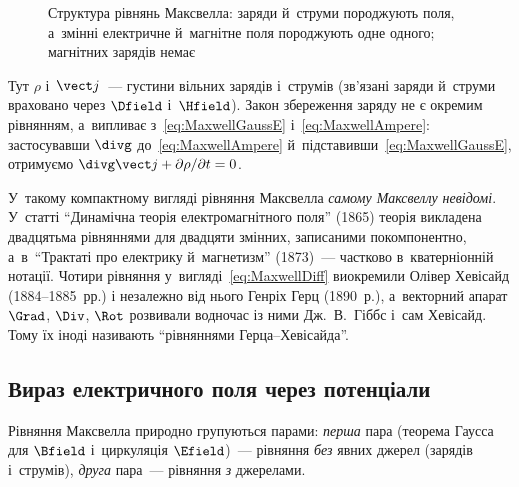 \begin{figure}[htbp]\centering
	\caption{Структура рівнянь Максвелла: заряди й~струми породжують поля, а~змінні електричне й~магнітне поля породжують одне одного; магнітних зарядів немає\label{pic:MaxwellScheme}}
\end{figure}

Тут $\rho$ і~$\vect j$~--- густини вільних зарядів і~струмів (зв'язані заряди й~струми
враховано через $\Dfield$ і~$\Hfield$). Закон збереження заряду не є окремим рівнянням,
а~випливає з~\eqref{eq:MaxwellGaussE} і~\eqref{eq:MaxwellAmpere}: застосувавши $\divg$ до~\eqref{eq:MaxwellAmpere} й~підставивши~\eqref{eq:MaxwellGaussE}, отримуємо $\divg\vect j + \partial\rho/\partial t = 0$.

\begin{Historical}
	У~такому компактному вигляді рівняння Максвелла \emph{самому Максвеллу невідомі}.
	У~статті \enquote{Динамічна теорія електромагнітного поля} (1865) теорія викладена
	двадцятьма рівняннями для двадцяти змінних, записаними покомпонентно, а~в~\enquote{Трактаті про електрику
	й~магнетизм} (1873)~--- частково в~кватерніонній нотації. Чотири рівняння у~вигляді~\eqref{eq:MaxwellDiff} виокремили Олівер Хевісайд (1884--1885~рр.) і незалежно від нього
	Генріх Герц (1890~р.), а~векторний апарат $\Grad$, $\Div$, $\Rot$ розвивали водночас із ними
	Дж.~В.~Гіббс і~сам Хевісайд. Тому їх іноді називають \enquote{рівняннями
	Герца--Хевісайда}.
\end{Historical}


\subsection*{Вираз електричного поля через потенціали}


Рівняння Максвелла природно групуються парами: \emph{перша} пара (теорема Гаусса для
$\Bfield$ і~циркуляція $\Efield$)~--- рівняння \emph{без} явних джерел (зарядів
і~струмів), \emph{друга} пара~--- рівняння \emph{з} джерелами.


